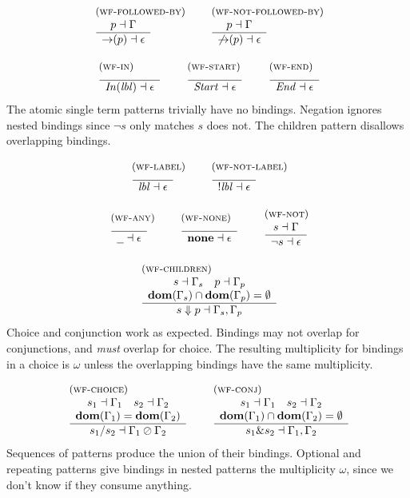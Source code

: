 \documentclass{article}
\newcommand{\rulename}{\textsc}
\newcommand{\irule}[3]{\begin{array}{l}{~\small\mbox{(\rulename{#1})}}\\\;\frac{\begin{array}{c}#2\end{array}}{\begin{array}{l}#3\end{array}}\end{array}}
\newcommand{\lbl}{\ensuremath{\mathit{lbl}}}
\newcommand{\por}[2]{\ensuremath{#1/#2}}
\newcommand{\pand}[2]{\ensuremath{#1\&#2}}
\newcommand{\children}[2]{\ensuremath{#1} \Downarrow #2}
\newcommand{\pnot}[1]{\ensuremath{\lnot #1}}
\newcommand{\any}{\ensuremath{\text{\underline{\hspace{0.6em}}}}}
\newcommand{\none}{\ensuremath{\mathbf{none}}}
\newcommand{\fb}[1]{\ensuremath{\mathop{\rightarrow}(#1)}}
\newcommand{\nfb}[1]{\ensuremath{\mathop{\not\rightarrow}(#1)}}
\newcommand{\pin}[1]{\ensuremath{\mathit{In}(#1)}}
\newcommand{\pstart}{\ensuremath{\mathit{Start}}}
\newcommand{\pend}{\ensuremath{\mathit{End}}}
\begin{document}
\[
  \begin{array}{c}
    \irule{wf-followed-by}{
    p \dashv \Gamma
    }{
    \fb{p} \dashv \epsilon
    }
    \quad
    \irule{wf-not-followed-by}{
    p \dashv \Gamma
    }{
    \nfb{p} \dashv \epsilon
    }
    \\\\
    \irule{wf-in}{
    }{
    \pin{\lbl} \dashv \epsilon
    }
    \quad
    \irule{wf-start}{
    }{
    \pstart \dashv \epsilon
    }
    \quad
    \irule{wf-end}{
    }{
    \pend \dashv \epsilon
    }
  \end{array}
\]
%
The atomic single term patterns trivially have no bindings.
Negation ignores nested bindings since \pnot{s} only matches $s$
does not.
%
The children pattern disallows overlapping bindings.

\[
  \begin{array}{c}
    \irule{wf-label}{
    }{
    \lbl \dashv \epsilon
    }
    \quad
    \irule{wf-not-label}{
    }{
    !\lbl \dashv \epsilon
    }
    \\\\
    \irule{wf-any}{
    }{
    \any \dashv \epsilon
    }
    \quad
    \irule{wf-none}{
    }{
    \none \dashv \epsilon
    }
    \quad
    \irule{wf-not}{
    s \dashv \Gamma
    }{
    \pnot{s} \dashv \epsilon
    }
    \\\\
    \irule{wf-children}{
    s \dashv \Gamma_s\quad
    p \dashv \Gamma_p\\
    \mathbf{dom}(\Gamma_s) \cap \mathbf{dom}(\Gamma_p) = \emptyset
    }{
    \children{s}{p} \dashv \Gamma_s, \Gamma_p
    }
  \end{array}
\]
%
Choice and conjunction work as expected. Bindings may not overlap
for conjunctions, and \emph{must} overlap for choice. The
resulting multiplicity for bindings in a choice is $\omega$ unless
the overlapping bindings have the same multiplicity.

\[
  \begin{array}{c}
    \irule{wf-choice}{
    s_1 \dashv \Gamma_1\quad
    s_2 \dashv \Gamma_2\\
    \mathbf{dom}(\Gamma_1) = \mathbf{dom}(\Gamma_2)
    }{
    \por{s_1}{s_2} \dashv \Gamma_1 \oslash \Gamma_2
    }
    \quad
    \irule{wf-conj}{
    s_1 \dashv \Gamma_1\quad
    s_2 \dashv \Gamma_2\\
    \mathbf{dom}(\Gamma_1) \cap \mathbf{dom}(\Gamma_2) = \emptyset
    }{
    \pand{s_1}{s_2} \dashv \Gamma_1, \Gamma_2
    }
  \end{array}
\]
%
Sequences of patterns produce the union of their bindings.
Optional and repeating patterns give bindings in nested patterns
the multiplicity $\omega$, since we don't know if they consume
anything.
\end{document}
